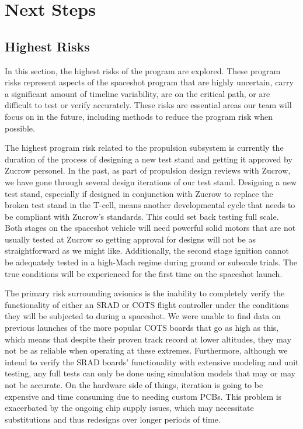 \section{Next Steps} \label{section:nextsteps}
\subsection{Highest Risks}

In this section, the highest risks of the program are explored. These program risks represent aspects of the spaceshot program that are highly uncertain, carry a significant amount of timeline variability, are on the critical path, or are difficult to test or verify accurately. These risks are essential areas our team will focus on in the future, including methods to reduce the program risk when possible. 

The highest program risk related to the propulsion subsystem is currently the duration of the process of designing a new test stand and getting it approved by Zucrow personel. In the past, as part of propulsion design reviews with Zucrow, we have gone through several design iterations of our test stand. Designing a new test stand, especially if designed in conjunction with Zucrow to replace the broken test stand in the T-cell, means another developmental cycle that needs to be compliant with Zucrow's standards. This could set back testing full scale. Both stages on the spaceshot vehicle will need powerful solid motors that are not usually tested at Zucrow so getting approval for designs will not be as straightforward as we might like. Additionally, the second stage ignition cannot be adequately tested in a high-Mach regime during ground or subscale trials. The true conditions will be experienced for the first time on the spaceshot launch. 

The primary risk surrounding avionics is the inability to completely verify the functionality of either an SRAD or COTS flight controller under the conditions they will be subjected to during a spaceshot. We were unable to find data on previous launches of the more popular COTS boards that go as high as this, which means that despite their proven track record at lower altitudes, they may not be as reliable when operating at these extremes. Furthermore, although we intend to verify the SRAD boards’ functionality with extensive modeling and unit testing, any full tests can only be done using simulation models that may or may not be accurate. On the hardware side of things, iteration is going to be expensive and time consuming due to needing custom PCBs. This problem is exacerbated by the ongoing chip supply issues, which may necessitate substitutions and thus redesigns over longer periods of time.

